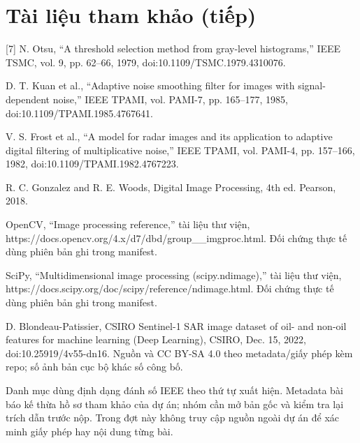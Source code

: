 \documentclass[13pt,a4paper]{extreport}
\begin{document}
\section*{Tài liệu tham khảo (tiếp)}
[7] N. Otsu, “A threshold selection method from gray-level histograms,” IEEE TSMC, vol. 9, pp. 62–66, 1979, doi:10.1109/TSMC.1979.4310076.
\par
[8] D. T. Kuan et al., “Adaptive noise smoothing filter for images with signal-dependent noise,” IEEE TPAMI, vol. PAMI-7, pp. 165–177, 1985, doi:10.1109/TPAMI.1985.4767641.
\par
[9] V. S. Frost et al., “A model for radar images and its application to adaptive digital filtering of multiplicative noise,” IEEE TPAMI, vol. PAMI-4, pp. 157–166, 1982, doi:10.1109/TPAMI.1982.4767223.
\par
[10] R. C. Gonzalez and R. E. Woods, Digital Image Processing, 4th ed. Pearson, 2018.
\par
[11] OpenCV, “Image processing reference,” tài liệu thư viện, https://docs.opencv.org/4.x/d7/dbd/group\_\_imgproc.html. Đối chứng thực tế dùng phiên bản ghi trong manifest.
\par
[12] SciPy, “Multidimensional image processing (scipy.ndimage),” tài liệu thư viện, https://docs.scipy.org/doc/scipy/reference/ndimage.html. Đối chứng thực tế dùng phiên bản ghi trong manifest.
\par
[13] D. Blondeau-Patissier, CSIRO Sentinel-1 SAR image dataset of oil- and non-oil features for machine learning (Deep Learning), CSIRO, Dec. 15, 2022, doi:10.25919/4v55-dn16. Nguồn và CC BY-SA 4.0 theo metadata/giấy phép kèm repo; số ảnh bản cục bộ khác số công bố.
\par
Danh mục dùng định dạng đánh số IEEE theo thứ tự xuất hiện. Metadata bài báo kế thừa hồ sơ tham khảo của dự án; nhóm cần mở bản gốc và kiểm tra lại trích dẫn trước nộp. Trong đợt này không truy cập nguồn ngoài dự án để xác minh giấy phép hay nội dung từng bài.
\par
\clearpage
\end{document}
